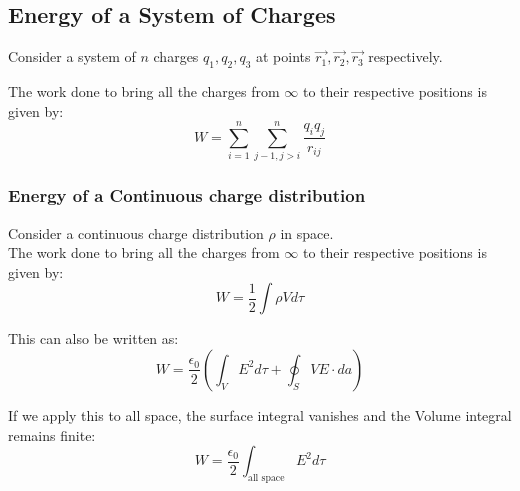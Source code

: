 \documentclass{article}
\begin{document}
\subsection{Energy of a System of Charges}
Consider a system of $n$ charges $q_1, q_2, q_3$ at points $\vec{r_1}, \vec{r_2}, \vec{r_3}$ respectively.\\

The work done to bring all the charges from $\infty$ to their respective positions is given by:
\[ W = \sum_{i = 1}^{n} \sum_{j-1, j>i}^{n} \frac{q_i q_j}{r_{ij}}  \]

\subsubsection{Energy of a Continuous charge distribution}
Consider a continuous charge distribution $\rho$ in space.\\
The work done to bring all the charges from $\infty$ to their respective positions is given by:
\[ W = \frac{1}{2} \int \rho V d\tau \]

This can also be written as:
\[ W = \frac{\epsilon_0}{2} \left(\int_{V} E^2 d\tau + \oint_{S} V E \cdot da  \right) \]

If we apply this to all space, the surface integral vanishes and the Volume integral remains finite:
\[ W = \frac{\epsilon_0}{2} \int_{\text{all space}} E^2 d\tau\]
\end{document}
